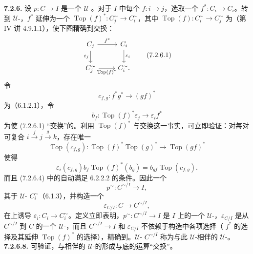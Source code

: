 \textbf{7.2.6.} 设 $p:C\to I$ 是一个 $\mathcal U$-。对于 $I$ 中每个 $f:i\to j$，选取一个 $f^*:C_i\to C_i$。转到 $\mathcal U$-，$f^*$ 延伸为一个 $\operatorname{Top}(f)^*:C_j^\sim\to C_i^\sim$，其中 $\operatorname{Top}(f):C_i^\sim\to C_j^\sim$ 为（第 IV 讲 4.9.1.1），使下图精确到交换：
\[\begin{tikzcd}
C_j\arrow[r,"f^*"]\arrow[d,"\varepsilon_j"']&C_i\arrow[d,"\varepsilon_i"]\\
C_j^\sim\arrow[r,"\operatorname{Top}(f)^*"']&C_i^\sim.
\end{tikzcd}\tag{7.2.6.1}\]
令
\[c_{f,g}:f^*g^*\longrightarrow(gf)^*\tag{7.2.6.2}\]
为（6.1.2.1），令
\[b_f:\operatorname{Top}(f)^*\varepsilon_j\longrightarrow\varepsilon_i f^*\tag{7.2.6.3}\]
为使 (7.2.6.1) “交换”的。利用 $\operatorname{Top}(f)^*$ 与交换这一事实，可立即验证：对每对可复合 $i\xrightarrow f j\xrightarrow g k$，存在唯一
\[\operatorname{Top}(c_{f,g}):\operatorname{Top}(f)^*\operatorname{Top}(g)^*\longrightarrow\operatorname{Top}(gf)^*\tag{7.2.6.4}\]
使得
\[\varepsilon_i(c_{f,g})b_f\operatorname{Top}(f)^*(b_g)=b_{gf}\operatorname{Top}(c_{f,g}).\tag{7.2.6.5}\]
而且 (7.2.6.4) 中的自动满足 6.2.2.2 的条件。因此一个
\[p^\sim:C^{\sim/I}\longrightarrow I,\tag{7.2.6.6}\]
其于 $\mathcal U$- $C_i^\sim$（6.1.3），并构造一个
\[\varepsilon_{C/I}:C\longrightarrow C^{\sim/I},\tag{7.2.6.7}\]
在上诱导 $\varepsilon_i:C_i\to C_i^\sim$。定义立即表明，$p^\sim:C^{\sim/I}\to I$ 是 $I$ 上的一个 $\mathcal U$-，$\varepsilon_{C/I}$ 是从 $C^{\sim/I}$ 到 $C$ 的一个 $\mathcal U$-，而且 $C^{\sim/I}\to I$ 和 $\varepsilon_{C/I}$ 不依赖于构造中各项选择（ $f^*$ 的选择及其延伸 $\operatorname{Top}(f)^*$ 的选择），精确到。$\mathcal U$- $C^{\sim/I}$ 称为与此 $\mathcal U$-相伴的 $\mathcal U$-。
\textbf{7.2.6.8.} 可验证，与相伴的 $\mathcal U$-的形成与底的运算“交换”。

